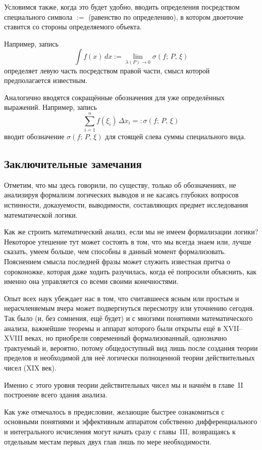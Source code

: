 Условимся также, когда это будет удобно, вводить определения посредством специального символа $:=$ (равенство по определению), в котором двоеточие ставится со стороны определяемого объекта.

Например, запись
\[
\int f(x)\,dx := \lim_{\lambda(P) \to 0} \sigma(f;\, P,\, \xi)
\]
определяет левую часть посредством правой части, смысл которой предполагается известным.

Аналогично вводятся сокращённые обозначения для уже определённых выражений. Например, запись
\[
\sum_{i=1}^{n} f(\xi_i)\,\Delta x_i =: \sigma(f;\, P,\, \xi)
\]
вводит обозначение $\sigma(f;\, P,\, \xi)$ для стоящей слева суммы специального вида.

\subsection{Заключительные замечания}

Отметим, что мы здесь говорили, по существу, только об обозначениях, не анализируя формализм логических выводов и не касаясь глубоких вопросов истинности, доказуемости, выводимости, составляющих предмет исследования математической логики.

Как же строить математический анализ, если мы не имеем формализации логики? Некоторое утешение тут может состоять в том, что мы всегда знаем или, лучше сказать, умеем больше, чем способны в данный момент формализовать. Пояснением смысла последней фразы может служить известная притча о сороконожке, которая даже ходить разучилась, когда её попросили объяснить, как именно она управляется со всеми своими конечностями.

Опыт всех наук убеждает нас в том, что считавшееся ясным или простым и нерасчленяемым вчера может подвергнуться пересмотру или уточнению сегодня. Так было (и, без сомнения, ещё будет) и с многими понятиями математического анализа, важнейшие теоремы и аппарат которого были открыты ещё в XVII--XVIII веках, но приобрели современный формализованный, однозначно трактуемый и, вероятно, потому общедоступный вид лишь после создания теории пределов и необходимой для неё логически полноценной теории действительных чисел (XIX век).

Именно с этого уровня теории действительных чисел мы и начнём в главе~II построение всего здания анализа.

Как уже отмечалось в предисловии, желающие быстрее ознакомиться с основными понятиями и эффективным аппаратом собственно дифференциального и интегрального исчисления могут начать сразу с главы~III, возвращаясь к отдельным местам первых двух глав лишь по мере необходимости.

